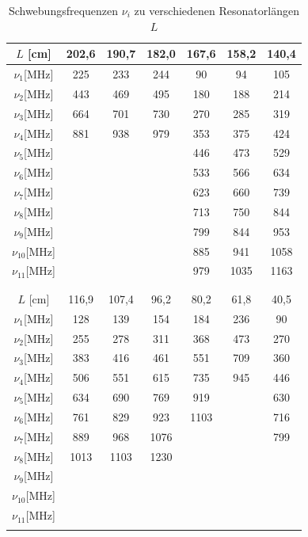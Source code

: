 \begin{table}
\centering
\caption{Schwebungsfrequenzen $\nu_i$ zu verschiedenen Resonatorlängen $L$}
\begin{tabular}{c c c c c c c}
\toprule
$L$ [cm]	&	202,6	&	190,7	&	182,0	&	167,6	&	158,2	&	140,4	\\
\midrule
$\nu_1$[MHz]	&	225	&	233	&	244	&	90	&	94	&	105	\\
$\nu_2$[MHz]	&	443	&	469	&	495	&	180	&	188	&	214	\\
$\nu_3$[MHz]	&	664	&	701	&	730	&	270	&	285	&	319	\\
$\nu_4$[MHz]	&	881	&	938	&	979	&	353	&	375	&	424	\\
$\nu_5$[MHz]	&		&		&		&	446	&	473	&	529	\\
$\nu_6$[MHz]	&		&		&		&	533	&	566	&	634	\\
$\nu_7$[MHz]	&		&		&		&	623	&	660	&	739	\\
$\nu_8$[MHz]	&		&		&		&	713	&	750	&	844	\\
$\nu_9$[MHz]	&		&		&		&	799	&	844	&	953	\\
$\nu_{10}$[MHz]	&		&		&		&	885	&	941	&	1058	\\
$\nu_{11}$[MHz]	&		&		&		&	979	&	1035	&	1163	\\
&		&		&		&		&		&\\
											\midrule		
&		&		&		&		&		&\\		
$L$ [cm]	&	116,9	&	107,4	&	96,2	&	80,2	&	61,8	&	40,5	\\
\midrule
$\nu_1$[MHz]	&	128	&	139	&	154	&	184	&	236	&	90	\\
$\nu_2$[MHz]	&	255	&	278	&	311	&	368	&	473	&	270	\\
$\nu_3$[MHz]	&	383	&	416	&	461	&	551	&	709	&	360	\\
$\nu_4$[MHz]	&	506	&	551	&	615	&	735	&	945	&	446	\\
$\nu_5$[MHz]	&	634	&	690	&	769	&	919	&		&	630	\\
$\nu_6$[MHz]	&	761	&	829	&	923	&	1103	&		&	716	\\
$\nu_7$[MHz]	&	889	&	968	&	1076	&		&		&	799	\\
$\nu_8$[MHz]	&	1013	&	1103	&	1230	&		&		&		\\
$\nu_9$[MHz]	&		&		&		&		&		&		\\
$\nu_{10}$[MHz]	&		&		&		&		&		&		\\
$\nu_{11}$[MHz]	&		&		&		&		&		&		\\

\bottomrule
\label{tab:Multimoden}
\end{tabular}
\end{table}





